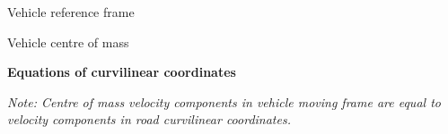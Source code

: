 \documentclass{article}
\begin{document}
\begin{maplegroup}
\begin{Maple Normal}{
Vehicle reference frame}\end{Maple Normal}

\begin{mapleinput}
\end{mapleinput}
\begin{Maple Normal}{
Vehicle centre of mass}\end{Maple Normal}

\begin{mapleinput}
\end{mapleinput}
\mapleresult
\begin{maplelatex}
\end{maplelatex}
\end{maplegroup}
\begin{maplegroup}
\begin{Maple Normal}{
\textbf{Equations of curvilinear coordinates}}\end{Maple Normal}

\end{maplegroup}
\begin{maplegroup}
\begin{Maple Normal}{
\textit{Note: Centre of mass velocity components in vehicle moving frame are equal to velocity components in road curvilinear coordinates.}}\end{Maple Normal}

\end{maplegroup}
\begin{maplegroup}
\begin{mapleinput}
\end{mapleinput}
\mapleresult
\begin{maplelatex}
\end{maplelatex}
\end{maplegroup}
\end{document}
